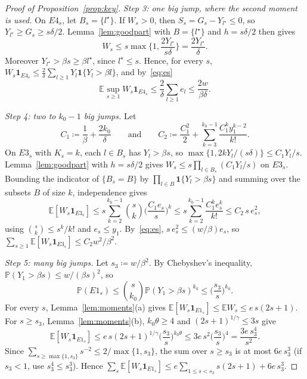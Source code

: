 \documentclass[11pt]{article}
\newcommand{\E}{\mathbb{E}}
\newcommand{\Prob}{\mathbb{P}}
\newcommand{\ind}{\mathbf{1}}
\begin{document}
\begin{proof}[Proof of Proposition~\ref{prop:key}]
\emph{Step 3: one big jump, where the second moment is used.} On $E4_s$, let $B_s=\{l^\star\}$. If
$W_s>0$, then $S_s=G_s-Y_{l^\star}\le0$, so $Y_{l^\star}\ge G_s\ge s\delta/2$. Lemma~\ref{lem:goodpart}
with $B=\{l^\star\}$ and $h=s\delta/2$ then gives
\[
  W_s\le s\max\Big\{1,\frac{2Y_{l^\star}}{s\delta}\Big\}=\frac{2Y_{l^\star}}{\delta}.
\]
Moreover $Y_{l^\star}>\beta s\ge\beta l^\star$, since $l^\star\le s$. Hence, for every $s$,
$W_s\ind_{E4_s}\le\frac2\delta\sum_{l\ge1}Y_l\ind\{Y_l>\beta l\}$, and by~\eqref{eq:es}
\[
  \E\sup_{s\ge1}W_s\ind_{E4_s}\le\frac2\delta\sum_{l\ge1}e_l\le\frac{2w}{\beta\delta}.
\]

\emph{Step 4: two to $k_0-1$ big jumps.} Let
\[
  C_1\coloneqq\frac1\beta+\frac{2k_0}{\delta}\qquad\text{and}\qquad
  C_2\coloneqq\frac{C_1^2}2+\sum_{k=3}^{k_0-1}\frac{C_1^ky_1^{k-2}}{k!}.
\]
On $E3_s$ with $K_s=k$, each $l\in B_s$ has $Y_l>\beta s$, so
$\max\{1,2kY_l/(s\delta)\}\le C_1Y_l/s$. Lemma~\ref{lem:goodpart} with $h=s\delta/2$ gives
$W_s\le s\prod_{l\in B_s}(C_1Y_l/s)$ on $E3_s$. Bounding the indicator of $\{B_s=B\}$ by
$\prod_{l\in B}\ind\{Y_l>\beta s\}$ and summing over the subsets $B$ of size $k$, independence gives
\[
  \E[W_s\ind_{E3_s}]\le s\sum_{k=2}^{k_0-1}\binom sk\Big(\frac{C_1e_s}{s}\Big)^k
  \le s\sum_{k=2}^{k_0-1}\frac{C_1^ke_s^k}{k!}\le C_2\,s\,e_s^2,
\]
using $\binom sk\le s^k/k!$ and $e_s\le y_1$. By~\eqref{eq:es}, $s\,e_s^2\le(w/\beta)e_s$, so
$\sum_{s\ge1}\E[W_s\ind_{E3_s}]\le C_2w^2/\beta^2$.

\emph{Step 5: many big jumps.} Let $s_3\coloneqq w/\beta^2$. By Chebyshev's inequality,
$\Prob(Y_1>\beta s)\le w/(\beta s)^2$, so
\[
  \Prob(E1_s)\le\binom s{k_0}\Prob(Y_1>\beta s)^{k_0}\le\Big(\frac{s_3}{s}\Big)^{k_0}.
\]
For every $s$, Lemma~\ref{lem:moments}(a) gives $\E[W_s\ind_{E1_s}]\le\E W_s\le e\,s(2s+1)$. For
$s\ge s_3$, Lemma~\ref{lem:moments}(b), $k_0\theta\ge4$ and $(2s+1)^{1/\gamma}\le3s$ give
\[
  \E[W_s\ind_{E1_s}]\le e\,s(2s+1)^{1/\gamma}\Big(\frac{s_3}{s}\Big)^{k_0\theta}\le3e\,s^2\Big(\frac{s_3}{s}\Big)^4=\frac{3e\,s_3^4}{s^2}.
\]
Since $\sum_{s\ge\max\{1,s_3\}}s^{-2}\le2/\max\{1,s_3\}$, the sum over $s\ge s_3$ is at most $6e\,s_3^3$
(if $s_3<1$, use $s_3^4\le s_3^3$). Hence
$\sum_s\E[W_s\ind_{E1_s}]\le e\sum_{1\le s<s_3}s(2s+1)+6e\,s_3^3$.


\end{proof}
\end{document}
